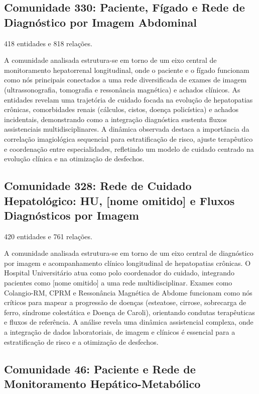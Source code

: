 \subsection*{Comunidade 330: Paciente, Fígado e Rede de Diagnóstico por Imagem Abdominal}

{\small 418 entidades e 818 relações.}

A comunidade analisada estrutura-se em torno de um eixo central de monitoramento hepatorrenal longitudinal, onde o paciente e o fígado funcionam como nós principais conectados a uma rede diversificada de exames de imagem (ultrassonografia, tomografia e ressonância magnética) e achados clínicos. As entidades revelam uma trajetória de cuidado focada na evolução de hepatopatias crônicas, comorbidades renais (cálculos, cistos, doença policística) e achados incidentais, demonstrando como a integração diagnóstica sustenta fluxos assistenciais multidisciplinares. A dinâmica observada destaca a importância da correlação imagiológica sequencial para estratificação de risco, ajuste terapêutico e coordenação entre especialidades, refletindo um modelo de cuidado centrado na evolução clínica e na otimização de desfechos.

\subsection*{Comunidade 328: Rede de Cuidado Hepatológico: HU, [nome omitido] e Fluxos Diagnósticos por Imagem}

{\small 420 entidades e 761 relações.}

A comunidade analisada estrutura-se em torno de um eixo central de diagnóstico por imagem e acompanhamento clínico longitudinal de hepatopatias crônicas. O Hospital Universitário atua como polo coordenador do cuidado, integrando pacientes como [nome omitido] a uma rede multidisciplinar. Exames como Colangio-RM, CPRM e Ressonância Magnética de Abdome funcionam como nós críticos para mapear a progressão de doenças (esteatose, cirrose, sobrecarga de ferro, síndrome colestática e Doença de Caroli), orientando condutas terapêuticas e fluxos de referência. A análise revela uma dinâmica assistencial complexa, onde a integração de dados laboratoriais, de imagem e clínicos é essencial para a estratificação de risco e a otimização de desfechos.

\subsection*{Comunidade 46: Paciente e Rede de Monitoramento Hepático-Metabólico}

